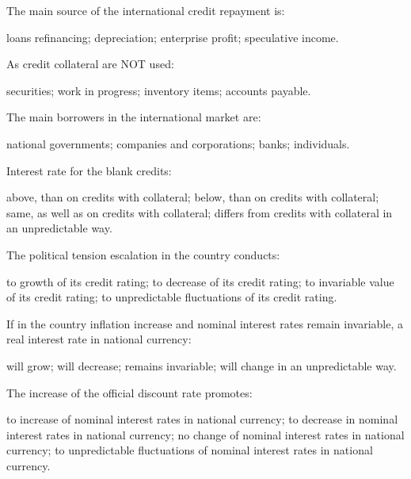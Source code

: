 \documentclass[12pt, table]{exam}
\begin{document}
\begin{questions}
\begin{multicols}{2}
\setlength{\columnsep}{1cm}

\question The main source of the international credit repayment is:
	 \begin{choices}
	 \CC loans refinancing;
	 \choice depreciation;
	 \choice enterprise profit;
	 \choice speculative income.
	 \end{choices}
\question As credit collateral are NOT used:
	 \begin{choices}
	 \choice securities;
	 \CC work in progress;
	 \choice inventory items;
	 \choice accounts payable.
	 \end{choices}
\question The main borrowers in the international market are:
	 \begin{choices}
	 \choice national governments;
	 \CC companies and corporations;
	 \choice banks;
	 \choice individuals.
	 \end{choices}
\question Interest rate for the blank credits:
	 \begin{choices}
	 \CC above, than on credits with collateral;
	 \choice below, than on credits with collateral;
	 \choice same, as well as on credits with collateral;
	 \choice differs from credits with collateral in an unpredictable way.
	 \end{choices}
\question The political tension escalation in the country conducts:
	 \begin{choices}
	 \choice to growth of its credit rating;
	 \CC to decrease of its credit rating;
	 \choice to invariable value of its credit rating;
	 \choice to unpredictable fluctuations of its credit rating.
	 \end{choices}
\question If in the country inflation increase and nominal interest rates remain invariable, a real interest rate in national currency:
	 \begin{choices}
	 \choice will grow;
	 \CC will decrease;
	 \choice remains invariable;
	 \choice will change in an unpredictable way.
	 \end{choices}
\question The increase of the official discount rate promotes:
	 \begin{choices}
	 \CC to increase of nominal interest rates in national currency;
	 \choice to decrease in nominal interest rates in national currency;
	 \choice no change of nominal interest rates in national currency;
	 \choice to unpredictable fluctuations of nominal interest rates in national currency.
	 \end{choices}

\end{multicols}
\end{questions}
\end{document}
